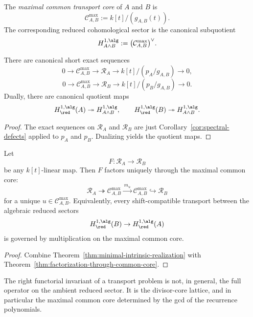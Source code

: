 \begin{definition}
The \emph{maximal common transport core} of \(A\) and \(B\) is
\[
\mathcal C^{\max}_{A,B}:=k[t]/(g_{A,B}(t)).
\]
The corresponding reduced cohomological sector is the canonical subquotient
\[
H^{1,\alg}_{A\wedge B}:=\bigl(\mathcal C^{\max}_{A,B}\bigr)^\vee.
\]
\end{definition}

\begin{theorem}
\ClaimStatusProvedHere
\label{thm:common-core-exact-sequences}
There are canonical short exact sequences
\[
0\longrightarrow \mathcal C^{\max}_{A,B}\longrightarrow \mathcal R_A\longrightarrow k[t]/(p_A/g_{A,B})\longrightarrow 0,
\]
\[
0\longrightarrow \mathcal C^{\max}_{A,B}\longrightarrow \mathcal R_B\longrightarrow k[t]/(p_B/g_{A,B})\longrightarrow 0.
\]
Dually, there are canonical quotient maps
\[
H^{1,\alg}_{\red}(A)\twoheadrightarrow H^{1,\alg}_{A\wedge B},
\qquad
H^{1,\alg}_{\red}(B)\twoheadrightarrow H^{1,\alg}_{A\wedge B}.
\]
\end{theorem}

\begin{proof}
The exact sequences on \(\mathcal R_A\) and \(\mathcal R_B\) are just Corollary~\ref{cor:spectral-defects}
applied to \(p_A\) and \(p_B\).
Dualizing yields the quotient maps.
\end{proof}

\begin{proposition}
\ClaimStatusProvedHere
\label{prop:transport-factors-through-common-core}
Let
\[
F\colon \mathcal R_A\to \mathcal R_B
\]
be any \(k[t]\)-linear map.
Then \(F\) factors uniquely through the maximal common core:
\[
\mathcal R_A\twoheadrightarrow \mathcal C^{\max}_{A,B}\xrightarrow{\,m_u\,}\mathcal C^{\max}_{A,B}\hookrightarrow \mathcal R_B
\]
for a unique \(u\in \mathcal C^{\max}_{A,B}\).
Equivalently, every shift-compatible transport between the algebraic reduced sectors
\[
H^{1,\alg}_{\red}(B)\to H^{1,\alg}_{\red}(A)
\]
is governed by multiplication on the maximal common core.
\end{proposition}

\begin{proof}
Combine Theorem~\ref{thm:minimal-intrinsic-realization} with
Theorem~\ref{thm:factorization-through-common-core}.
\end{proof}

\begin{corollary}
\ClaimStatusProvedHere
The right functorial invariant of a transport problem is not, in general, the full operator on the ambient reduced sector.
It is the divisor-core lattice, and in particular the maximal common core determined by the gcd of the recurrence polynomials.
\end{corollary}

